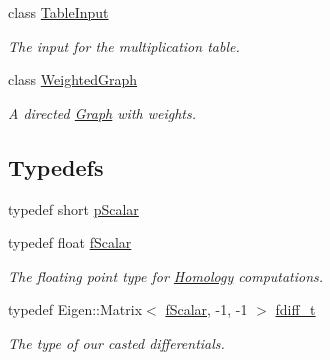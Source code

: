 \begin{DoxyCompactItemize}
class \hyperlink{classMackey_1_1TableInput}{Table\+Input}
\begin{DoxyCompactList}\small\item\em The input for the multiplication table. \end{DoxyCompactList}\item 
class \hyperlink{classMackey_1_1WeightedGraph}{Weighted\+Graph}
\begin{DoxyCompactList}\small\item\em A directed \hyperlink{classMackey_1_1Graph}{Graph} with weights. \end{DoxyCompactList}\end{DoxyCompactItemize}
\subsection*{Typedefs}
\begin{DoxyCompactItemize}
\item 
typedef short \hyperlink{namespaceMackey_a67b5f4650ba2f166d15133a1bea2472b}{p\+Scalar}
\item 
typedef float \hyperlink{namespaceMackey_aa1901d96dd7e8dd384bb01f47a893552}{f\+Scalar}
\begin{DoxyCompactList}\small\item\em The floating point type for \hyperlink{classMackey_1_1Homology}{Homology} computations. \end{DoxyCompactList}\item 
typedef Eigen\+::\+Matrix$<$ \hyperlink{namespaceMackey_aa1901d96dd7e8dd384bb01f47a893552}{f\+Scalar}, -\/1, -\/1 $>$ \hyperlink{namespaceMackey_a0070de220d906e8e603d5ab4c68e7784}{fdiff\+\_\+t}
\begin{DoxyCompactList}\small\item\em The type of our casted differentials. \end{DoxyCompactList}\end{DoxyCompactItemize}

